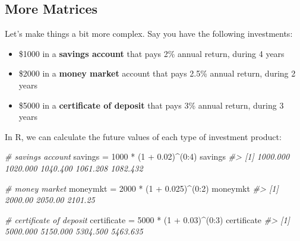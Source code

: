 \documentclass[
]{book}
\newenvironment{Shaded}{\begin{snugshade}}{\end{snugshade}}
\newcommand{\CommentTok}[1]{\textcolor[rgb]{0.56,0.35,0.01}{\textit{#1}}}
\newcommand{\DecValTok}[1]{\textcolor[rgb]{0.00,0.00,0.81}{#1}}
\newcommand{\FloatTok}[1]{\textcolor[rgb]{0.00,0.00,0.81}{#1}}
\newcommand{\NormalTok}[1]{#1}
\newcommand{\OtherTok}[1]{\textcolor[rgb]{0.56,0.35,0.01}{#1}}
\newcommand{\SpecialCharTok}[1]{\textcolor[rgb]{0.00,0.00,0.00}{#1}}
\begin{document}
\hypertarget{more-matrices}{%
\subsection{More Matrices}\label{more-matrices}}

Let's make things a bit more complex. Say you have the following investments:

\begin{itemize}
\item
  \$1000 in a \textbf{savings account} that pays 2\% annual return, during 4 years
\item
  \$2000 in a \textbf{money market} account that pays 2.5\% annual return, during
  2 years
\item
  \$5000 in a \textbf{certificate of deposit} that pays 3\% annual return, during
  3 years
\end{itemize}

In R, we can calculate the future values of each type of investment product:

\begin{Shaded}
\begin{Highlighting}[]
\CommentTok{\# savings account}
\NormalTok{savings }\OtherTok{=} \DecValTok{1000} \SpecialCharTok{*}\NormalTok{ (}\DecValTok{1} \SpecialCharTok{+} \FloatTok{0.02}\NormalTok{)}\SpecialCharTok{\^{}}\NormalTok{(}\DecValTok{0}\SpecialCharTok{:}\DecValTok{4}\NormalTok{)}
\NormalTok{savings}
\CommentTok{\#\textgreater{} [1] 1000.000 1020.000 1040.400 1061.208 1082.432}
\end{Highlighting}
\end{Shaded}

\begin{Shaded}
\begin{Highlighting}[]
\CommentTok{\# money market}
\NormalTok{moneymkt }\OtherTok{=} \DecValTok{2000} \SpecialCharTok{*}\NormalTok{ (}\DecValTok{1} \SpecialCharTok{+} \FloatTok{0.025}\NormalTok{)}\SpecialCharTok{\^{}}\NormalTok{(}\DecValTok{0}\SpecialCharTok{:}\DecValTok{2}\NormalTok{)}
\NormalTok{moneymkt}
\CommentTok{\#\textgreater{} [1] 2000.00 2050.00 2101.25}
\end{Highlighting}
\end{Shaded}

\begin{Shaded}
\begin{Highlighting}[]
\CommentTok{\# certificate of deposit}
\NormalTok{certificate }\OtherTok{=} \DecValTok{5000} \SpecialCharTok{*}\NormalTok{ (}\DecValTok{1} \SpecialCharTok{+} \FloatTok{0.03}\NormalTok{)}\SpecialCharTok{\^{}}\NormalTok{(}\DecValTok{0}\SpecialCharTok{:}\DecValTok{3}\NormalTok{)}
\NormalTok{certificate}
\CommentTok{\#\textgreater{} [1] 5000.000 5150.000 5304.500 5463.635}
\end{Highlighting}
\end{Shaded}
\end{document}

